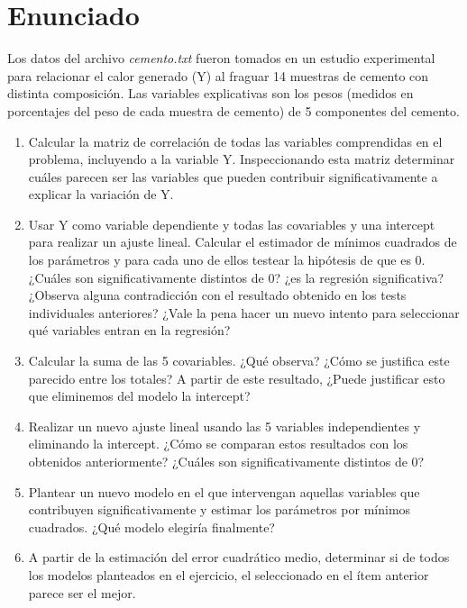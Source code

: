 \documentclass{estilo}
\begin{document}
\maketitle

\section*{Enunciado}
Los datos del archivo \textit{cemento.txt} fueron tomados en un estudio experimental para relacionar el calor generado (Y) al fraguar 14 muestras de cemento con distinta composición. Las variables explicativas son los pesos (medidos en porcentajes del peso de cada muestra de cemento) de 5 componentes del cemento.

\begin{enumerate}
    \item[\hyperlink{ej1}{1.}] Calcular la matriz de correlación de todas las variables comprendidas en el problema, incluyendo a la variable Y. Inspeccionando esta matriz determinar cuáles parecen ser las variables que pueden contribuir significativamente a explicar la variación de Y.
    \item[\hyperlink{ej2}{2.}] Usar Y como variable dependiente y todas las covariables y una intercept para realizar un ajuste lineal. Calcular el estimador de mínimos cuadrados de los parámetros y para cada uno de ellos testear la hipótesis de que es 0. ¿Cuáles son significativamente distintos de 0? ¿es la regresión significativa? ¿Observa alguna contradicción con el resultado obtenido en los tests individuales anteriores? ¿Vale la pena hacer un nuevo intento para seleccionar qué variables entran en la regresión?
    \item[\hyperlink{ej3}{3.}] Calcular la suma de las 5 covariables. ¿Qué observa? ¿Cómo se justifica este parecido entre los totales? A partir de este resultado, ¿Puede justificar esto que eliminemos del modelo la intercept?
    \item[\hyperlink{ej4}{4.}] Realizar un nuevo ajuste lineal usando las 5 variables independientes y eliminando la intercept. ¿Cómo se comparan estos resultados con los obtenidos anteriormente? ¿Cuáles son significativamente distintos de 0?
    \item[\hyperlink{ej5}{5.}] Plantear un nuevo modelo en el que intervengan aquellas variables que contribuyen significativamente y estimar los parámetros por mínimos cuadrados. ¿Qué modelo elegiría finalmente?
    \item[\hyperlink{ej6}{6.}] A partir de la estimación del error cuadrático medio, determinar si de todos los modelos planteados en el ejercicio, el seleccionado en el ítem anterior parece ser el mejor.
\end{enumerate}
\newpage
\end{document}
